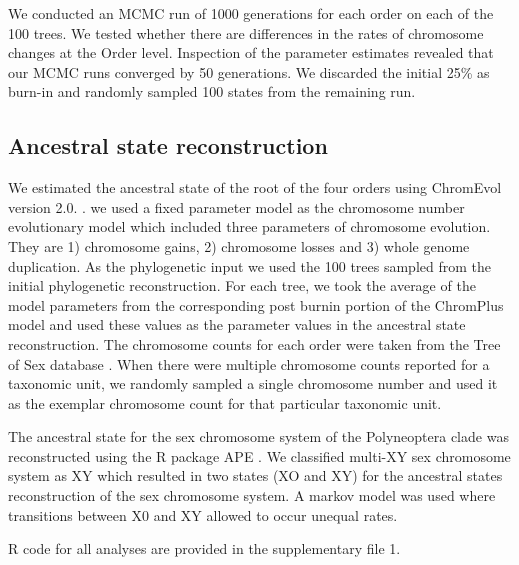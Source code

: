 We conducted an MCMC run of 1000 generations for each order on each of the 100 trees.
We tested whether there are differences in the rates of chromosome changes at the Order level.
Inspection of the parameter estimates revealed that our MCMC runs converged by 50 generations.  
We discarded the initial 25\% as burn-in and randomly sampled 100 states from the remaining run. 

\subsection{Ancestral state reconstruction}
We estimated the ancestral state of the root of the four orders using ChromEvol version 2.0. \citep{glick2014chromevol, mayrose2009chromevol}.
we used a fixed parameter model as the chromosome number evolutionary model which included three parameters of chromosome evolution.
They are 1) chromosome gains, 2) chromosome losses and 3) whole genome duplication.
As the phylogenetic input we used the 100 trees sampled from the initial phylogenetic reconstruction. 
For each tree, we took the average of the model parameters from the corresponding post burnin portion of the ChromPlus model and used these values as the parameter values in the ancestral state reconstruction.
The chromosome counts for each order were taken from the Tree of Sex database \citep{blackmon2016,TOS2014}.
When there were multiple chromosome counts reported for a taxonomic unit, we randomly sampled a single chromosome number and used it as the exemplar chromosome count for that particular taxonomic unit.

The ancestral state for the sex chromosome system of the Polyneoptera clade was reconstructed using the R package APE \citep{Paradis2018}.
We classified multi-XY sex chromosome system as XY which resulted in two states (XO and XY) for the ancestral states reconstruction of the sex chromosome system.
A markov model was used where transitions between X0 and XY allowed to occur unequal rates.

R code for all analyses are provided in the supplementary file 1.